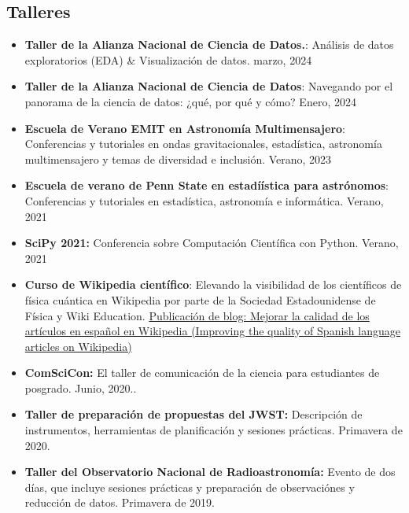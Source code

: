 \documentclass[letterpaper,10pt]{article}
\begin{document}
\subsection*{Talleres}
\begin{itemize}[label=$\blacktriangleright$]

\item \textbf{Taller de la Alianza Nacional de Ciencia de Datos.}: An\'alisis de datos exploratorios (EDA) \& Visualizaci\'on de datos. marzo, 2024




\item \textbf{Taller de la Alianza Nacional de Ciencia de Datos}: Navegando por el panorama de la ciencia de datos: ¿qu\'e, por qu\'e y c\'omo? Enero, 2024


\item \textbf{Escuela de Verano EMIT en Astronom\'ia Multimensajero}: Conferencias y tutoriales en ondas gravitacionales, estad\'istica, astronom\'ia multimensajero y temas de diversidad e inclusi\'on. Verano, 2023

\item \textbf{Escuela de verano de Penn State en estadí\'istica para astr\'onomos}: Conferencias y tutoriales en estad\'istica, astronom\'ia e inform\'atica. Verano, 2021

\item \textbf{SciPy 2021:} Conferencia sobre Computaci\'on Cient\'ifica con Python. Verano, 2021
    \item  \textbf{Curso de Wikipedia cient\'ifico}: Elevando la visibilidad de los cient\'ificos de f\'isica cu\'antica en Wikipedia por parte de la Sociedad Estadounidense de F\'isica y Wiki Education. \href{https://wikiedu.org/blog/2021/05/24/improving-the-quality-of-spanish-language-articles-on-wikipedia/}{Publicaci\'on de blog: Mejorar la calidad de los art\'iculos en espa\~{n}ol en Wikipedia (Improving the quality of Spanish language articles on Wikipedia)}
    \item \textbf{ComSciCon:} El taller de comunicaci\'on de la ciencia para estudiantes de posgrado. Junio, 2020..
    


            \item \textbf{Taller de preparaci\'on de propuestas del JWST:} Descripci\'on de instrumentos, herramientas de planificaci\'on y sesiones pr\'acticas. Primavera de 2020.

    
    
    
        \item \textbf{Taller del Observatorio Nacional de Radioastronom\'ia:}  Evento de dos d\'ias, que incluye sesiones pr\'acticas y preparaci\'on de observaci\'ones y reducci\'on de datos. Primavera de 2019.

\end{itemize}
\end{document}
